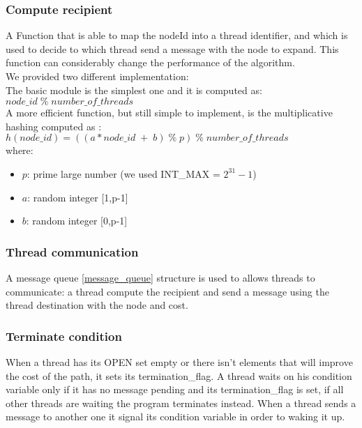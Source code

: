 \subsubsection{Compute recipient}
\label{compute_reci}

A Function that is able to map the nodeId into a thread identifier, and which is used to decide to which thread send a message with the node to expand.
This function can considerably change the performance of the algorithm.
\\ We provided two different implementation:
\\
The basic module is the simplest one and it is computed as: \\
$node\_id \; \% \;  number\_of\_threads$
\\
A more efficient function, but still simple to implement, is the multiplicative hashing computed as \cite{bibVideoMulHash}: \\
$ h(node\_id) =((a*node\_id \; + \; b) \; \% \; p) \; \% \; number\_of\_threads $  
\\ where:
\begin{itemize}
    \item $p$: prime large number (we used INT\_MAX =  $ 2^{31}-1 $)
    \item $a$: random integer [1,p-1]
    \item $b$: random integer [0,p-1]
\end{itemize}


\subsubsection{Thread communication}
\label{thread_buf}

A message queue \ref{message_queue} structure is used to allows threads to communicate: a thread compute the recipient and send a message using the thread destination with the node and cost. 

\subsubsection{Terminate condition}
\label{terminate}

When a thread has its OPEN set empty or there isn't elements that will improve the cost of the path, it sets its termination\_flag.
A thread waits on his condition variable only if it has no message pending and its termination\_flag is set, if all other threads are waiting the program terminates instead.
When a thread sends a message to another one it signal its condition variable in order to waking it up. 

